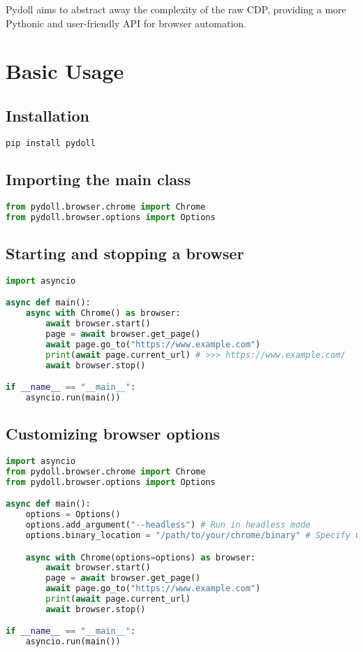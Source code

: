 \documentclass{article}
\begin{document}
\noindent Pydoll aims to abstract away the complexity of the raw CDP, providing a more Pythonic and user-friendly API for browser automation.

\section{Basic Usage}

\subsection{Installation}

\begin{lstlisting}[language=bash]
pip install pydoll
\end{lstlisting}

\subsection{Importing the main class}

\begin{lstlisting}[language=Python]
from pydoll.browser.chrome import Chrome
from pydoll.browser.options import Options
\end{lstlisting}

\subsection{Starting and stopping a browser}

\begin{lstlisting}[language=Python]
import asyncio

async def main():
    async with Chrome() as browser:
        await browser.start()
        page = await browser.get_page()
        await page.go_to("https://www.example.com")
        print(await page.current_url) # >>> https://www.example.com/
        await browser.stop()

if __name__ == "__main__":
    asyncio.run(main())
\end{lstlisting}

\subsection{Customizing browser options}

\begin{lstlisting}[language=Python]
import asyncio
from pydoll.browser.chrome import Chrome
from pydoll.browser.options import Options

async def main():
    options = Options()
    options.add_argument("--headless") # Run in headless mode
    options.binary_location = "/path/to/your/chrome/binary" # Specify Chrome binary path

    async with Chrome(options=options) as browser:
        await browser.start()
        page = await browser.get_page()
        await page.go_to("https://www.example.com")
        print(await page.current_url)
        await browser.stop()

if __name__ == "__main__":
    asyncio.run(main())
\end{lstlisting}
\end{document}
